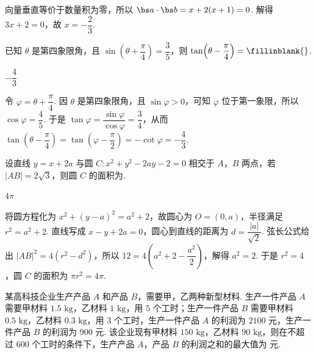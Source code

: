 \begin{solution}
向量垂直等价于数量积为零，所以 \(\bs a\cdot\bs b=x+2(x+1)=0\). 解得 \(3x+2=0\)，故 \(x=-\dfrac23\).
\end{solution}

\begin{problem}
已知 \(\theta\) 是第四象限角，且 \(\sin\!\left(\theta+\dfrac{\pi}{4}\right)=\dfrac35\)，则 \(\tan\!\left(\theta-\dfrac{\pi}{4}\right)=\fillinblank{}\).
\end{problem}

\begin{answer}
\(-\dfrac43\)
\end{answer}

\begin{solution}
令 \(\varphi=\theta+\dfrac\pi4\). 因 \(\theta\) 是第四象限角，且 \(\sin\varphi>0\)，可知 \(\varphi\) 位于第一象限，所以 \(\cos\varphi=\dfrac45\). 于是 \(\tan\varphi=\dfrac{\sin\varphi}{\cos\varphi}=\dfrac34\)，从而 \(\tan\!\left(\theta-\dfrac\pi4\right)=\tan\!\left(\varphi-\dfrac\pi2\right)=-\cot\varphi=-\dfrac43\).
\end{solution}

\begin{problem}
设直线 \(y=x+2a\) 与圆 \(C:x^2+y^2-2ay-2=0\) 相交于 \(A\)，\(B\) 两点，若 \(|AB|=2\sqrt3\)，则圆 \(C\) 的面积为\fillinblank{}.
\end{problem}

\begin{answer}
\(4\pi\)
\end{answer}

\begin{solution}
将圆方程化为 \(x^2+(y-a)^2=a^2+2\)，故圆心为 \(O=(0,a)\)，半径满足 \(r^2=a^2+2\). 直线写成 \(x-y+2a=0\)，圆心到直线的距离为 \(d=\dfrac{|a|}{\sqrt2}\). 弦长公式给出 \(|AB|^2=4(r^2-d^2)\)，所以 \(12=4\left(a^2+2-\dfrac{a^2}{2}\right)\)，解得 \(a^2=2\). 于是 \(r^2=4\)，圆 \(C\) 的面积为 \(\pi r^2=4\pi\).
\end{solution}

\begin{problem}
某高科技企业生产产品 \(A\) 和产品 \(B\)，需要甲，乙两种新型材料. 生产一件产品 \(A\) 需要甲材料 \(1.5\text{ kg}\)，乙材料 \(1\text{ kg}\)，用 \(5\) 个工时；生产一件产品 \(B\) 需要甲材料 \(0.5\text{ kg}\)，乙材料 \(0.3\text{ kg}\)，用 \(3\) 个工时，生产一件产品 \(A\) 的利润为 \(2100\) 元，生产一件产品 \(B\) 的利润为 \(900\) 元. 该企业现有甲材料 \(150\text{ kg}\)，乙材料 \(90\text{ kg}\)，则在不超过 \(600\) 个工时的条件下，生产产品 \(A\)，产品 \(B\) 的利润之和的最大值为\fillinblank{} 元.
\end{problem}

